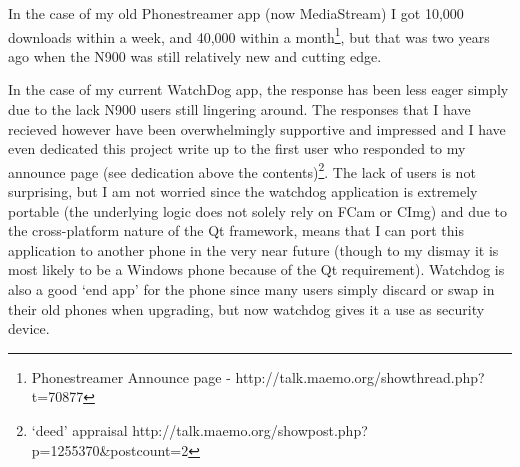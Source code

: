 In the case of my old Phonestreamer app (now MediaStream) I got 10,000 downloads within a week, and 40,000 within a month\footnote{Phonestreamer Announce page - http://talk.maemo.org/showthread.php?t=70877}\label{ref:phonser}, but that was two years ago when the N900 was still relatively new and cutting edge.

In the case of my current WatchDog app, the response has been less eager simply due to the lack N900 users still lingering around. The responses that I have recieved however have been overwhelmingly supportive and impressed and I have even dedicated this project write up to the first user who responded to my announce page (see dedication above the contents)\footnote{‘deed’ appraisal http://talk.maemo.org/showpost.php?p=1255370\&postcount=2}\label{ref:appraisal}. The lack of users is not surprising, but I am not worried since the watchdog application is extremely portable (the underlying logic does not solely rely on FCam or CImg) and due to the cross-platform nature of the Qt framework, means that I can port this application to another phone in the very near future (though to my dismay it is most likely to be a Windows phone because of the Qt requirement). Watchdog is also a good ‘end app’ for the phone since many users simply discard or swap in their old phones when upgrading, but now watchdog gives it a use as security device.

